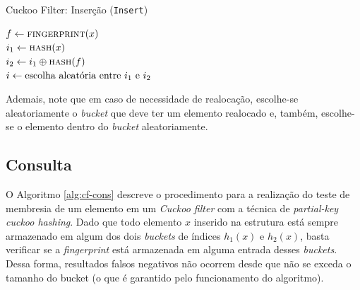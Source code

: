 \documentclass[12pt,twoside,english,brazilian]{book}
\begin{document}
\begin{algorithm}
    \caption{Cuckoo Filter: Inserção (\texttt{Insert})}\label{alg:cf-ins}

    $f \leftarrow \Call{fingerprint}{x}$ \\
    $i_1 \leftarrow \Call{hash}{x}$ \\
    $i_2 \leftarrow i_1 \oplus \Call{hash}{f}$ \\
    $i \leftarrow \textup{escolha aleatória entre } i_1 \textup{ e } i_2$ \\
     
\end{algorithm}

Ademais, note que em caso de necessidade de realocação, escolhe-se aleatoriamente o \textit{bucket} que deve ter um elemento realocado e, também, escolhe-se o elemento dentro do \textit{bucket} aleatoriamente.

\subsection{Consulta}

O Algoritmo \ref{alg:cf-cons} descreve o procedimento para a realização do teste de membresia de um elemento em um \textit{Cuckoo filter} com a técnica de \textit{partial-key cuckoo hashing}. Dado que todo elemento $x$ inserido na estrutura está sempre armazenado em algum dos dois \textit{buckets} de índices $h_1(x)$ e $h_2(x)$, basta verificar se a \textit{fingerprint} está armazenada em alguma entrada desses \textit{buckets}. Dessa forma, resultados falsos negativos não ocorrem desde que não se exceda o tamanho do bucket (o que é garantido pelo funcionamento do algoritmo).
\end{document}
